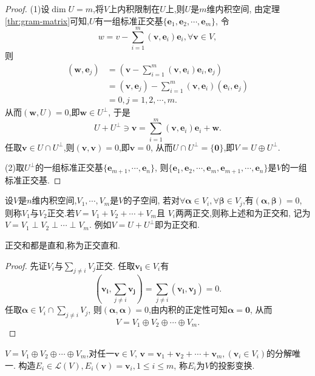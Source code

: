\begin{proof}
  (1)设$\dim U=m$,将$V$上内积限制在$U$上,则$U$是$m$维内积空间,
  由定理\ref{thr:gram-matrix}可知,$U$有一组标准正交基$\{\bm{e}_1,\bm{e}_2,\cdots,\bm{e}_m\}$,
  令
  \[
  w=v-\sum_{i=1}^m(\bm{v},\bm{e}_i)\bm{e}_i, \forall \bm{v}\in V,
  \]
  则
  \begin{align*}
    (\bm{w},\bm{e}_j) & = (\bm{v}-\sum_{i=1}^m(\bm{v},\bm{e}_i)\bm{e}_i,\bm{e}_j)\\
    & = (\bm{v},\bm{e}_j)-\sum_{i=1}^m(\bm{v},\bm{e}_i)(\bm{e}_i,\bm{e}_j)\\
    & = 0, j=1,2,\cdots,m.
  \end{align*}
  从而$(\bm{w},U)=0$,即$\bm{w}\in U^{\perp}$,
  于是
  \[
  U+U^{\perp}\ni \bm{v}=\sum_{i=1}^m(\bm{v},\bm{e}_i)\bm{e}_i+\bm{w}.
  \] 
  任取$\bm{v}\in U\cap U^{\perp}$,则$(\bm{v},\bm{v})=0$,即$\bm{v}=0$,
  从而$U\cap U^{\perp}=\{\bm{0}\}$,即$V=U\oplus U^{\perp}$.

  (2)取$U^{\perp}$的一组标准正交基$\{\bm{e}_{m+1},\cdots,\bm{e}_n\}$,
  则$\{\bm{e}_1,\bm{e}_2,\cdots,\bm{e}_m,\bm{e}_{m+1},\cdots,\bm{e}_n\}$是$V$的一组标准正交基.
\end{proof}

\begin{definition}
  设$V$是$n$维内积空间,$V_1,\cdots,V_m$是$V$的子空间,
  若对$\forall \bm{\alpha}\in V_i,\forall \bm{\beta}\in V_j$,有$(\bm{\alpha},\bm{\beta})=0$, 
  则称$V_1$与$V_2$正交.若$V=V_1+V_2+\cdots+V_m$且
  $V_i$两两正交,则称上述和为正交和,
  记为$V=V_1\perp V_2\perp\cdots\perp V_m$.
  例如$V=U+U^{\perp}$即为正交和.
\end{definition}

\begin{theory}
  正交和都是直和,称为正交直和.
\end{theory}

\begin{proof}
  先证$V_i$与$\sum\limits_{j\neq i}V_j$正交.
  任取$\bm{v_i} \in V_i$有
  \[
  (\bm{v_i},\sum_{j\neq i}\bm{v_j}) = \sum_{j\neq i}(\bm{v_i},\bm{v_j}) = 0.
  \]
  任取$\bm{\alpha}\in V_i\cap\sum\limits_{j\neq i}V_j$,
  则$(\bm{\alpha},\bm{\alpha})=0$,由内积的正定性可知$\bm{\alpha}=\bm{0}$,
  从而
  \[
  V=V_1\oplus V_2\oplus\cdots\oplus V_m.
  \]
\end{proof}

\begin{definition}
$V=V_1\oplus V_2\oplus\cdots\oplus V_m$,对任一$\bm{v}\in V$,
$\bm{v}=\bm{v}_1+\bm{v}_2+\cdots+\bm{v}_m, (\bm{v}_i\in V_i)$的分解唯一.
构造$E_i \in \mathscr{L}(V), E_i(\bm{v})=\bm{v}_i, 1 \leq i \leq m$,
称$E_i$为$V$的{\heiti 投影变换}.
\end{definition}

